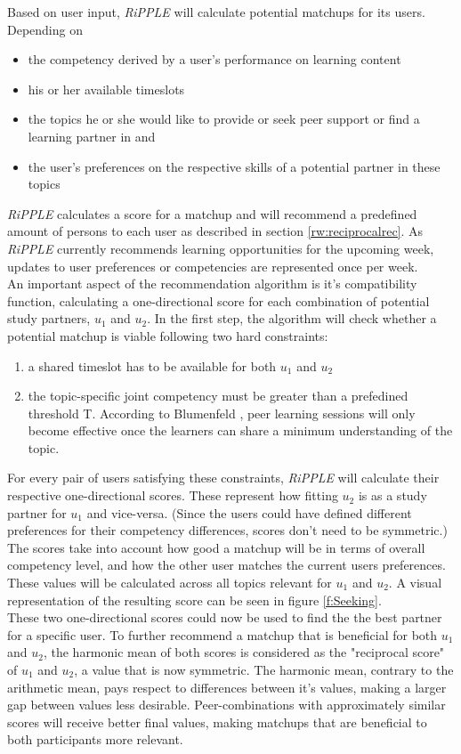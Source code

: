 \documentclass[conference]{IEEEtran}
\begin{document}
Based on user input, \textit{RiPPLE} will calculate potential matchups for its users. Depending on
\begin{itemize}
	\item the competency derived by a user's performance on learning content
	\item his or her available timeslots
	\item the topics he or she would like to provide or seek peer support or find a learning partner in and
	\item the user's preferences on the respective skills of a potential partner in these topics
\end{itemize}
\textit{RiPPLE} calculates a score for a matchup and will recommend a predefined amount of persons to each user as described in section \ref{rw:reciprocalrec}. As \textit{RiPPLE} currently recommends learning opportunities for the upcoming week, updates to user preferences or competencies are represented once per week.\\
An important aspect of the recommendation algorithm is it's compatibility function, calculating a one-directional score for each combination of potential study partners, \(u_1\) and \(u_2\). In the first step, the algorithm will check whether a potential matchup is viable following two hard constraints:
\begin{enumerate}
	\item a shared timeslot has to be available for both \(u_1\) and \(u_2\)
	\item the topic-specific joint competency must be greater than a prefedined threshold T. According to Blumenfeld \cite{blumenfeld1996learning}, peer learning sessions will only become effective once the learners can share a minimum understanding of the topic.
\end{enumerate}
For every pair of users satisfying these constraints, \textit{RiPPLE} will calculate their respective one-directional scores. These represent how fitting \(u_2\) is as a study partner for \(u_1\) and vice-versa. (Since the users could have defined different preferences for their competency differences, scores don't need to be symmetric.) The scores take into account how good a matchup will be in terms of overall competency level, and how the other user matches the current users preferences. These values will be calculated across all topics relevant for \(u_1\) and \(u_2\). A visual representation of the resulting score can be seen in figure \ref{f:Seeking}.\\
These two one-directional scores could now be used to find the the best partner for a specific user. To further recommend a matchup that is beneficial for both \(u_1\) and \(u_2\), the harmonic mean of both scores is considered as the "reciprocal score" of \(u_1\) and \(u_2\), a value that is now symmetric. \cite{prabhakar2017reciprocal} The harmonic mean, contrary to the arithmetic mean, pays respect to differences between it's values, making a larger gap between values less desirable. Peer-combinations with approximately similar scores will receive better final values, making matchups that are beneficial to both participants more relevant.\\
\end{document}
